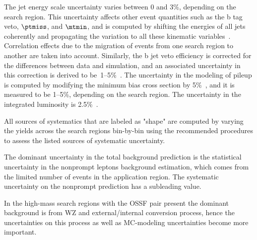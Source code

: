 The jet energy scale uncertainty varies between 0 and 3\%, depending on the search region. 
This uncertainty affects other event quantities such as the b tag veto, $\ptmiss$, and $\mtmin$, 
and is computed by shifting the energies of all jets coherently and propagating the variation to all these kinematic variables~\cite{jecDataMC}. 
Correlation effects due to the migration of events from one search region to another are taken into account. 
Similarly, the b jet veto efficiency is corrected for the differences between data and simulation, 
and an associated uncertainty in this correction is derived to be~1--5\%~\cite{btagSF}. 
The uncertainty in the modeling of pileup is computed by modifying the minimum bias cross section by 5\%~\cite{PUtwiki},
and it is measured to be 1--5\%, depending on the search region. 
The uncertainty in the integrated luminosity is 2.5\%~\cite{CMS-PAS-LUM-17-001}.

All sources of systematics that are labeled as "shape" are computed by varying the yields across the search regions 
bin-by-bin using the recommended procedures to assess the listed sources of systematic uncertainty.  

The dominant uncertainty in the total background prediction is the statistical uncertainty in the nonprompt leptons background estimation,
which comes from the limited number of events in the application region. The systematic uncertainty on the nonprompt prediction has
a subleading value. 

In the high-mass search regions with the OSSF pair present the dominant background is from WZ and external/internal conversion process, hence
the uncertainties on this process as well as MC-modeling uncertainties become more important.

